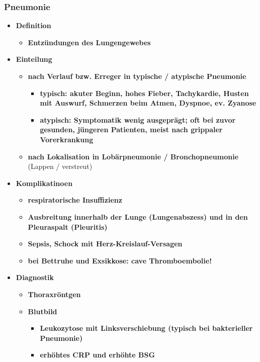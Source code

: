 	\subsubsection{Pneumonie}
		\begin{itemize}
			\item \textbf{Definition}
				\begin{itemize}
					\item \textbf{Entzündungen des Lungengewebes}
				\end{itemize}
			\item \textbf{Einteilung}
				\begin{itemize}
					\item \textbf{nach Verlauf bzw. Erreger in typische / atypische Pneumonie}
						\begin{itemize}
							\item \textbf{typisch: akuter Beginn, hohes Fieber, Tachykardie, Husten mit Auswurf, Schmerzen beim Atmen, Dyspnoe, ev. Zyanose}
							\item \textbf{atypisch: Symptomatik wenig ausgeprägt; oft bei zuvor gesunden, jüngeren Patienten, meist nach grippaler Vorerkrankung}
						\end{itemize}
					\item \textbf{nach Lokalisation in Lobärpneumonie / Bronchopneumonie} (Lappen / verstreut)
				\end{itemize}
			\item \textbf{Komplikatinoen}
				\begin{itemize}
					\item \textbf{respiratorische Insuffizienz}
					\item \textbf{Ausbreitung innerhalb der Lunge (Lungenabszess) und in den Pleuraspalt (Pleuritis)}
					\item \textbf{Sepsis, Schock mit Herz-Kreislauf-Versagen}
					\item \textbf{bei Bettruhe und Exsikkose: cave Thromboembolie!}
				\end{itemize}
			\item \textbf{Diagnostik}
				\begin{itemize}
					\item \textbf{Thoraxröntgen}
					\item \textbf{Blutbild}
						\begin{itemize}
							\item \textbf{Leukozytose mit Linksverschiebung (typisch bei bakterieller Pneumonie)}
							\item \textbf{erhöhtes CRP und erhöhte BSG}

\end{itemize}
\end{itemize}
\end{itemize}
